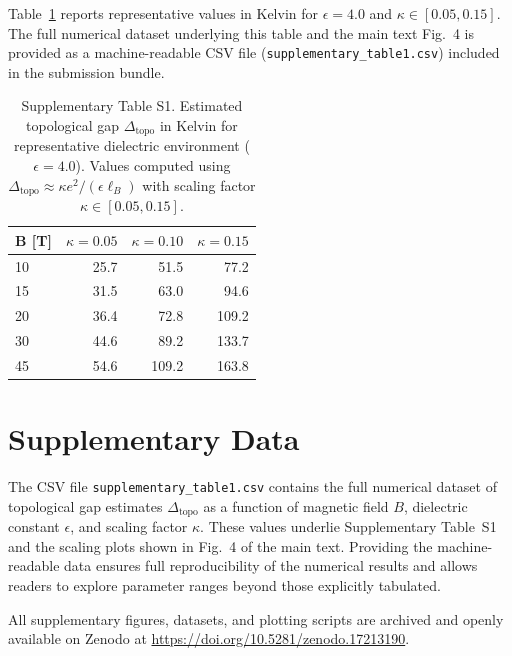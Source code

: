 \documentclass[aps,prl,onecolumn,superscriptaddress]{revtex4-2}
\begin{document}
Table~\ref{tab:delta_topo_estimates} reports representative values in Kelvin for $\epsilon = 4.0$ and $\kappa \in [0.05, 0.15]$. 
The full numerical dataset underlying this table and the main text Fig.~4 is provided as a machine-readable CSV file (\texttt{supplementary\_table1.csv}) included in the submission bundle.

\begin{table}[h]
\centering
\caption{Supplementary Table S1. Estimated topological gap $\Delta_{\text{topo}}$ in Kelvin for representative dielectric environment ($\epsilon=4.0$). Values computed using $\Delta_{\text{topo}} \approx \kappa e^2/(\epsilon \ell_B)$ with scaling factor $\kappa \in [0.05,0.15]$.}
\label{tab:delta_topo_estimates}
\begin{tabular}{lrrr}
\toprule
\textbf{B [T]} &  $\kappa=0.05$ &  $\kappa=0.10$ &  $\kappa=0.15$ \\
\midrule
10 &    25.7 &    51.5 &    77.2 \\
15 &    31.5 &    63.0 &    94.6 \\
20 &    36.4 &    72.8 &   109.2 \\
30 &    44.6 &    89.2 &   133.7 \\
45 &    54.6 &   109.2 &   163.8 \\
\bottomrule
\end{tabular}
\end{table}


\section{Supplementary Data}
The CSV file \texttt{supplementary\_table1.csv} contains the full numerical dataset of topological gap estimates $\Delta_{\text{topo}}$ as a function of magnetic field $B$, dielectric constant $\epsilon$, and scaling factor $\kappa$. 
These values underlie Supplementary Table~S1 and the scaling plots shown in Fig.~4 of the main text. 
Providing the machine-readable data ensures full reproducibility of the numerical results and allows readers to explore parameter ranges beyond those explicitly tabulated.

All supplementary figures, datasets, and plotting scripts are archived and openly available on Zenodo at \url{https://doi.org/10.5281/zenodo.17213190}.
\end{document}
